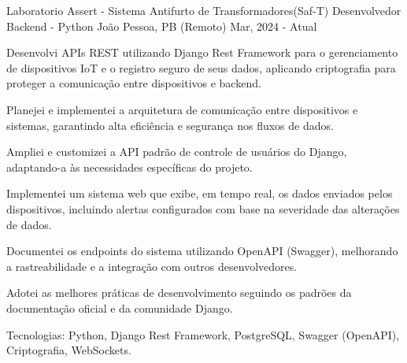 
\begin{cventries}
  \cventry
  {Laboratorio Assert - Sistema Antifurto de Transformadores(Saf-T)} %
  {Desenvolvedor Backend - Python} %
  {João Pessoa, PB (Remoto)} %
  {Mar, 2024 - Atual} %
  {
    \begin{cvitems} %
      \item {{Desenvolvi} APIs REST utilizando Django Rest Framework para o gerenciamento de dispositivos IoT e o registro seguro de seus dados, aplicando criptografia para proteger a comunicação entre dispositivos e backend.}
      \item {Planejei e implementei a arquitetura de comunicação entre dispositivos e sistemas, garantindo alta eficiência e segurança nos fluxos de dados.}
      \item {Ampliei e customizei a API padrão de controle de usuários do Django, adaptando-a às necessidades específicas do projeto.}
      \item {Implementei um sistema web que exibe, em tempo real, os dados enviados pelos dispositivos, incluindo alertas configurados com base na severidade das alterações de dados.}
      \item {Documentei os endpoints do sistema utilizando OpenAPI (Swagger), melhorando a rastreabilidade e a integração com outros desenvolvedores.}
      \item {Adotei as melhores práticas de desenvolvimento seguindo os padrões da documentação oficial e da comunidade Django.}
      \item {Tecnologias: Python, Django Rest Framework, PostgreSQL, Swagger (OpenAPI), Criptografia, WebSockets.}
    \end{cvitems}
  }


\end{cventries}
